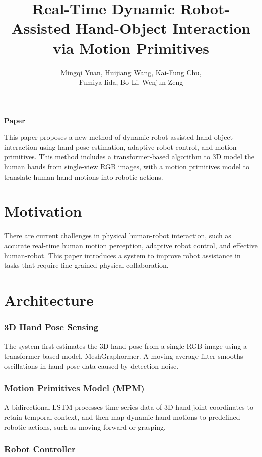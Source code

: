 \documentclass{article}
\title{Real-Time Dynamic Robot-Assisted Hand-Object Interaction via Motion Primitives}
\author{Mingqi Yuan, Huijiang Wang, Kai-Fung Chu, \\ Fumiya Iida, Bo Li, Wenjun Zeng}
\date{}
\begin{document}
\maketitle

\begin{center}\textbf{\href{https://arxiv.org/pdf/2405.19531}{Paper}}\end{center}

This paper proposes a new method of dynamic robot-assisted hand-object interaction using hand pose estimation, adaptive robot control, and motion primitives. This method includes a transformer-based algorithm to 3D model the human hands from single-view RGB images, with a motion primitives model to translate human hand motions into robotic actions.

\section*{Motivation}

There are current challenges in physical human-robot interaction, such as accurate real-time human motion perception, adaptive robot control, and effective human-robot. This paper introduces a system to improve robot assistance in tasks that require fine-grained physical collaboration.

\section*{Architecture}

\subsubsection*{3D Hand Pose Sensing}

The system first estimates the 3D hand pose from a single RGB image using a transformer-based model, MeshGraphormer. A moving average filter smooths oscillations in hand pose data caused by detection noise.

\subsubsection*{Motion Primitives Model (MPM)}

A bidirectional LSTM processes time-series data of 3D hand joint coordinates to retain temporal context, and then map dynamic hand motions to predefined robotic actions, such as moving forward or grasping.

\subsubsection*{Robot Controller}
\end{document}

